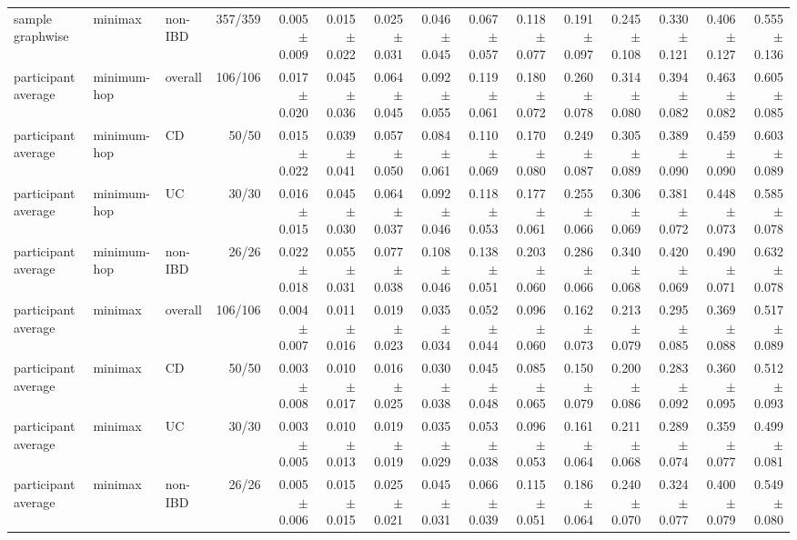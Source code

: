 \begin{table}[ht]
{\begin{tabular}{lllrrrrrrrrrrrr}
sample graphwise & minimax & non-IBD & 357/359 & 0.005 $\pm$ 0.009 & 0.015 $\pm$ 0.022 & 0.025 $\pm$ 0.031 & 0.046 $\pm$ 0.045 & 0.067 $\pm$ 0.057 & 0.118 $\pm$ 0.077 & 0.191 $\pm$ 0.097 & 0.245 $\pm$ 0.108 & 0.330 $\pm$ 0.121 & 0.406 $\pm$ 0.127 & 0.555 $\pm$ 0.136 \\
participant average & minimum-hop & overall & 106/106 & 0.017 $\pm$ 0.020 & 0.045 $\pm$ 0.036 & 0.064 $\pm$ 0.045 & 0.092 $\pm$ 0.055 & 0.119 $\pm$ 0.061 & 0.180 $\pm$ 0.072 & 0.260 $\pm$ 0.078 & 0.314 $\pm$ 0.080 & 0.394 $\pm$ 0.082 & 0.463 $\pm$ 0.082 & 0.605 $\pm$ 0.085 \\
participant average & minimum-hop & CD & 50/50 & 0.015 $\pm$ 0.022 & 0.039 $\pm$ 0.041 & 0.057 $\pm$ 0.050 & 0.084 $\pm$ 0.061 & 0.110 $\pm$ 0.069 & 0.170 $\pm$ 0.080 & 0.249 $\pm$ 0.087 & 0.305 $\pm$ 0.089 & 0.389 $\pm$ 0.090 & 0.459 $\pm$ 0.090 & 0.603 $\pm$ 0.089 \\
participant average & minimum-hop & UC & 30/30 & 0.016 $\pm$ 0.015 & 0.045 $\pm$ 0.030 & 0.064 $\pm$ 0.037 & 0.092 $\pm$ 0.046 & 0.118 $\pm$ 0.053 & 0.177 $\pm$ 0.061 & 0.255 $\pm$ 0.066 & 0.306 $\pm$ 0.069 & 0.381 $\pm$ 0.072 & 0.448 $\pm$ 0.073 & 0.585 $\pm$ 0.078 \\
participant average & minimum-hop & non-IBD & 26/26 & 0.022 $\pm$ 0.018 & 0.055 $\pm$ 0.031 & 0.077 $\pm$ 0.038 & 0.108 $\pm$ 0.046 & 0.138 $\pm$ 0.051 & 0.203 $\pm$ 0.060 & 0.286 $\pm$ 0.066 & 0.340 $\pm$ 0.068 & 0.420 $\pm$ 0.069 & 0.490 $\pm$ 0.071 & 0.632 $\pm$ 0.078 \\
participant average & minimax & overall & 106/106 & 0.004 $\pm$ 0.007 & 0.011 $\pm$ 0.016 & 0.019 $\pm$ 0.023 & 0.035 $\pm$ 0.034 & 0.052 $\pm$ 0.044 & 0.096 $\pm$ 0.060 & 0.162 $\pm$ 0.073 & 0.213 $\pm$ 0.079 & 0.295 $\pm$ 0.085 & 0.369 $\pm$ 0.088 & 0.517 $\pm$ 0.089 \\
participant average & minimax & CD & 50/50 & 0.003 $\pm$ 0.008 & 0.010 $\pm$ 0.017 & 0.016 $\pm$ 0.025 & 0.030 $\pm$ 0.038 & 0.045 $\pm$ 0.048 & 0.085 $\pm$ 0.065 & 0.150 $\pm$ 0.079 & 0.200 $\pm$ 0.086 & 0.283 $\pm$ 0.092 & 0.360 $\pm$ 0.095 & 0.512 $\pm$ 0.093 \\
participant average & minimax & UC & 30/30 & 0.003 $\pm$ 0.005 & 0.010 $\pm$ 0.013 & 0.019 $\pm$ 0.019 & 0.035 $\pm$ 0.029 & 0.053 $\pm$ 0.038 & 0.096 $\pm$ 0.053 & 0.161 $\pm$ 0.064 & 0.211 $\pm$ 0.068 & 0.289 $\pm$ 0.074 & 0.359 $\pm$ 0.077 & 0.499 $\pm$ 0.081 \\
participant average & minimax & non-IBD & 26/26 & 0.005 $\pm$ 0.006 & 0.015 $\pm$ 0.015 & 0.025 $\pm$ 0.021 & 0.045 $\pm$ 0.031 & 0.066 $\pm$ 0.039 & 0.115 $\pm$ 0.051 & 0.186 $\pm$ 0.064 & 0.240 $\pm$ 0.070 & 0.324 $\pm$ 0.077 & 0.400 $\pm$ 0.079 & 0.549 $\pm$ 0.080 \\
\bottomrule
\end{tabular}%
}
\end{table}
